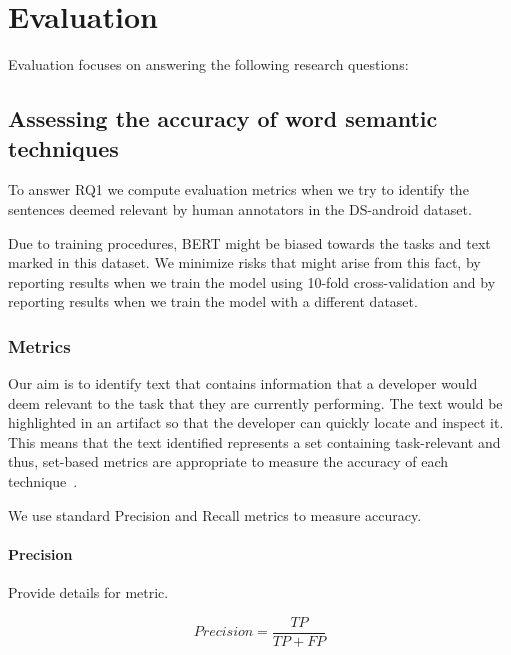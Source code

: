 \section{Evaluation}
\label{cp5:evaluation}


Evaluation focuses 
on answering the following research questions:





\subsection{Assessing the accuracy of word semantic techniques}


To answer RQ1 we compute evaluation metrics when we try to identify the sentences deemed relevant by human annotators in the \acs{DS-android} dataset.


Due to training procedures, BERT might be biased towards the tasks and text marked in this dataset. We minimize risks that might arise from this fact, by reporting results when we train the model using 10-fold cross-validation and by reporting results when we 
train the model with a different dataset.


\subsubsection{Metrics}


Our aim is to identify text that contains information that a developer would deem relevant to the task that they are currently performing. 
The text would be highlighted in an artifact so that the developer can quickly locate and inspect it. 
This means that the text identified represents a set containing task-relevant and thus, 
set-based metrics are appropriate to measure the accuracy of each technique~\cite{Manning2009IR}.


We use standard Precision and Recall metrics to measure accuracy.





\paragraph{\textbf{Precision}}

Provide details for metric.



\begin{equation}
\label{eq:cp5:precision}    
    Precision = \frac{TP}{TP + FP}
\end{equation}


